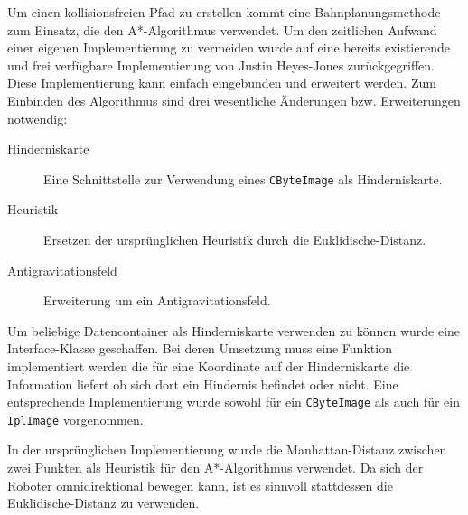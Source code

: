 Um einen kollisionsfreien Pfad zu erstellen kommt eine Bahnplanungsmethode zum Einsatz, die den A*-Algorithmus verwendet. Um den zeitlichen Aufwand einer eigenen Implementierung zu vermeiden wurde auf eine bereits existierende und frei verfügbare Implementierung von Justin Heyes-Jones\cite{jonesAstar} zurückgegriffen. 
Diese Implementierung kann einfach eingebunden und erweitert werden. Zum Einbinden des Algorithmus sind drei wesentliche Änderungen bzw. Erweiterungen notwendig:
\begin{description}
	\item[Hinderniskarte] Eine Schnittstelle zur Verwendung eines \lstinline{CByteImage} als Hinderniskarte.
	\item[Heuristik] Ersetzen der ursprünglichen Heuristik durch die \gls{Euklidische-Distanz}.
	\item[Antigravitationsfeld] Erweiterung um ein Antigravitationsfeld.
\end{description}

Um beliebige Datencontainer als Hinderniskarte verwenden zu können wurde eine Interface-Klasse geschaffen. Bei deren Umsetzung muss eine Funktion implementiert werden die für eine Koordinate auf der Hinderniskarte die Information liefert ob sich dort ein Hindernis befindet oder nicht. Eine entsprechende Implementierung wurde sowohl für ein \lstinline{CByteImage} als auch für ein \lstinline{IplImage} vorgenommen.

In der ursprünglichen Implementierung wurde die \gls{Manhattan-Distanz} zwischen zwei Punkten als Heuristik für den A*-Algorithmus verwendet. Da sich der Roboter omnidirektional bewegen kann, ist es sinnvoll stattdessen die \gls{Euklidische-Distanz} zu verwenden.

